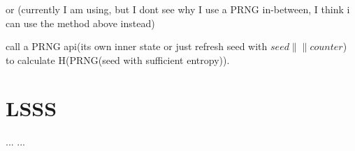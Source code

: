 \documentclass{article}
\begin{document}
or 
(currently I am using, but I dont see why I use a PRNG in-between, I think i can use the method above instead)

call a PRNG api(its own inner state or just refresh seed with $seed \|\| counter$) to calculate H(PRNG(seed with sufficient entropy)).


\section{LSSS}




\begin{thebibliography}{99}
 ...
 ...
\end{thebibliography}
\end{document}
